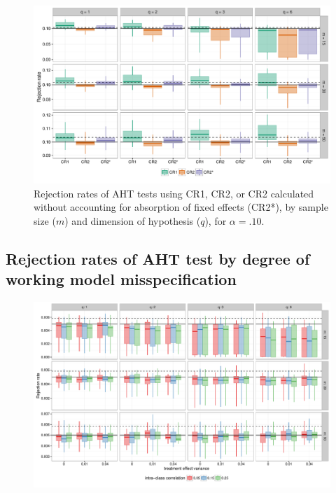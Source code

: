 \documentclass{article}\usepackage[]{graphicx}\usepackage[]{color}
\newenvironment{knitrout}{}{} %
\begin{document}
\begin{landscape}
\begin{knitrout}
\begin{figure}[H]
{\centering \includegraphics[width=\linewidth]{CR_fig/absorption_10-1} 

}

\caption[Rejection rates of AHT tests using CR1, CR2, or CR2 calculated without accounting for absorption of fixed effects (CR2*), by sample size (]{Rejection rates of AHT tests using CR1, CR2, or CR2 calculated without accounting for absorption of fixed effects (CR2*), by sample size ($m$) and dimension of hypothesis ($q$), for $\alpha = .10$.}\label{fig:absorption_10}
\end{figure}


\end{knitrout}

\newpage
\subsection{Rejection rates of AHT test by degree of working model misspecification}

\begin{knitrout}
\color{fgcolor}\begin{figure}[H]

{\centering \includegraphics[width=\linewidth]{CR_fig/misspecification_005-1} 

}
\end{figure}
\end{knitrout}
\end{landscape}
\end{document}
